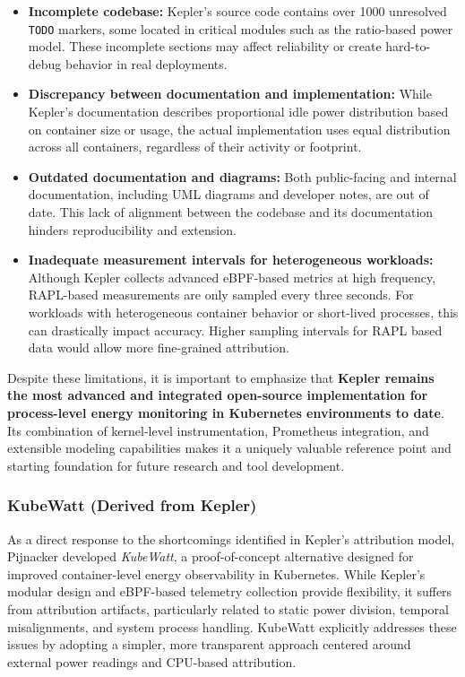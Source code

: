 \begin{itemize}
    \item \textbf{Incomplete codebase:} Kepler’s source code contains over 1000 unresolved \texttt{TODO} markers, some located in critical modules such as the ratio-based power model. These incomplete sections may affect reliability or create hard-to-debug behavior in real deployments.
    \item \textbf{Discrepancy between documentation and implementation:} While Kepler’s documentation describes proportional idle power distribution based on container size or usage, the actual implementation uses equal distribution across all containers, regardless of their activity or footprint.
    \item \textbf{Outdated documentation and diagrams:} Both public-facing and internal documentation, including UML diagrams and developer notes, are out of date. This lack of alignment between the codebase and its documentation hinders reproducibility and extension.
    \item \textbf{Inadequate measurement intervals for heterogeneous workloads:} Although Kepler collects advanced eBPF-based metrics at high frequency, RAPL-based measurements are only sampled every three seconds. For workloads with heterogeneous container behavior or short-lived processes, this can drastically impact accuracy. Higher sampling intervals for RAPL based data would allow more fine-grained attribution.
\end{itemize}

Despite these limitations, it is important to emphasize that \textbf{Kepler remains the most advanced and integrated open-source implementation for process-level energy monitoring in Kubernetes environments to date}. Its combination of kernel-level instrumentation, Prometheus integration, and extensible modeling capabilities makes it a uniquely valuable reference point and starting foundation for future research and tool development.

\subsubsection{KubeWatt (Derived from Kepler)}
\label{sec:kubewatt}

As a direct response to the shortcomings identified in Kepler's attribution model, Pijnacker developed \textit{KubeWatt}, a proof-of-concept alternative designed for improved container-level energy observability in Kubernetes. While Kepler's modular design and eBPF-based telemetry collection provide flexibility, it suffers from attribution artifacts, particularly related to static power division, temporal misalignments, and system process handling. KubeWatt explicitly addresses these issues by adopting a simpler, more transparent approach centered around external power readings and CPU-based attribution.

